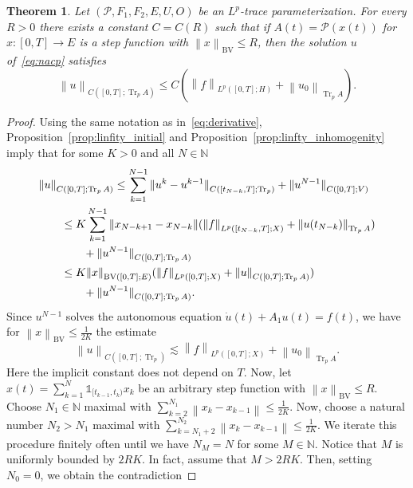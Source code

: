 \documentclass[reqno,a4paper,final]{amsart}
\numberwithin{equation}{section}
\newtheorem{theorem}[lemma]{Theorem}
\theoremstyle{definition}
\begin{document}
	\begin{theorem}\label{thm:a_priori_bounded}
		Let $(\mathcal{P}, F_1 , F_2, E, U, O)$ be an $L^p$-trace parameterization. For every $R > 0$ there exists a constant $C = C(R)$ such that if $A(t) = \mathcal{P}(x(t))$ for $x\colon [0,T] \to E$ is a step function with ${\left\lVert{x}\right\rVert}_\operatorname{BV} \le R$, then the solution $u$ of~\eqref{eq:nacp} satisfies
			\[
				{\left\lVert{u}\right\rVert}_{C([0,T];\operatorname{Tr}_p A)} \le C ({\left\lVert{f}\right\rVert}_{L^p([0,T];H)} + {\left\lVert{u_0}\right\rVert}_{\operatorname{Tr}_p A}).
			\]
	\end{theorem}
	\begin{proof}
		Using the same notation as in~\eqref{eq:derivative}, Proposition~\ref{prop:linfity_initial} and Proposition~\ref{prop:linfty_inhomogenity} imply that for some $K > 0$ and all $N \in {\mathbb{N}}$
		\begin{equation*}
    		\begin{split}
        		\MoveEqLeft {\left\lVert{u}\right\rVert}_{C([0,T];\operatorname{Tr}_p A)} \le \sum_{k=1}^{N-1} {\lVert{u^k - u^{k-1}}\rVert}_{C([t_{N-k},T];\operatorname{Tr}_p)} + {\lVert{u^{N-1}}\rVert}_{C([0,T];V)} \\
        		& \le K \sum_{k=1}^{N-1} {\left\lVert{x_{N-k+1} - x_{N-k}}\right\rVert} ({\left\lVert{f}\right\rVert}_{L^p([t_{N-k},T];X)} + {\left\lVert{u(t_{N-k})}\right\rVert}_{\operatorname{Tr}_p A}) \\
    			& \qquad + {\lVert{u^{N-1}}\rVert}_{C([0,T];\operatorname{Tr}_p A)} \\
        		& \le K {\left\lVert{x}\right\rVert}_{\operatorname{BV}([0,T];E)} ({\left\lVert{f}\right\rVert}_{L^p([0,T];X)} + {\left\lVert{u}\right\rVert}_{C([0,T];\operatorname{Tr}_p A)}) \\
    			& \qquad + {\lVert{u^{N-1}}\rVert}_{C([0,T];\operatorname{Tr}_p A)}.
    		\end{split}
    	\end{equation*}
		Since $u^{N-1}$ solves the autonomous equation $\dot{u}(t) + A_1 u(t) = f(t)$, we have for ${\left\lVert{x}\right\rVert}_\operatorname{BV} \le \frac{1}{2K}$ the estimate
		\begin{equation}
			\label{eq:linfty_estimate}
			{\left\lVert{u}\right\rVert}_{C([0,T];\operatorname{Tr}_p)} \lesssim {\left\lVert{f}\right\rVert}_{L^p([0,T];X)} + {\left\lVert{u_0}\right\rVert}_{\operatorname{Tr}_p A}.
		\end{equation}
		Here the implicit constant does not depend on $T$. Now, let $x(t) = \sum_{k=1}^N \mathds{1}_{[t_{k-1},t_k)} x_k$ be an arbitrary step function with ${\left\lVert{x}\right\rVert}_\operatorname{BV} \le R$. Choose $N_1 \in {\mathbb{N}}$ maximal with $\sum_{k=2}^{N_1} {\left\lVert{x_{k} - x_{k-1}}\right\rVert} \le \frac{1}{2K}$. Now, choose a natural number $N_2 > N_1$ maximal with $\sum_{k=N_1 + 2}^{N_2} {\left\lVert{x_{k} - x_{k-1}}\right\rVert} \le \frac{1}{2K}$. We iterate this procedure finitely often until we have $N_M = N$ for some $M \in {\mathbb{N}}$. Notice that $M$ is uniformly bounded by $2RK$. In fact, assume that $M > 2RK$. Then, setting $N_0 = 0$, we obtain the contradiction

\end{proof}
\end{document}
